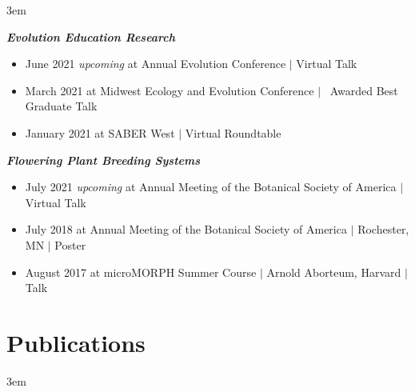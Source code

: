 \documentclass[]{article}
\begin{document}
\vspace{3mm}
\leftskip 3em

\textit{\textbf{Evolution Education Research}}
\begin{itemize}[label=$\mathwitch*$]
\item{June 2021 \textit{upcoming} at Annual Evolution Conference $\vert$ Virtual Talk 
\hspace{0.3mm} \href{https://ledelaney.org/talks/2021evolution}{\faImages} \href{https://github.com/ledelaney/06-21-Evolution}{\faGithub}}
\item{March 2021 at Midwest Ecology and Evolution Conference $\vert$ \faAward\ Awarded Best Graduate Talk \hspace{0.3mm} \href{https://ledelaney.org/talks/2021meec/}{\faImages} \href{https://github.com/ledelaney/03-21-MEEC}{\faGithub}}
\item{January 2021 at SABER West $\vert$ Virtual Roundtable \hspace{0.3mm} \href{https://ledelaney.org/talks/2021saberw/}{\faImages} \href{https://github.com/ledelaney/01-21-SABERwest}{\faGithub}}
\end{itemize}

\vspace{2mm}

\textit{\textbf{Flowering Plant Breeding Systems}}

\begin{itemize}[label=$\mathwitch*$]
\item{July 2021 \textit{upcoming} at Annual Meeting of the Botanical Society of America $\vert$ Virtual Talk}
\item{July 2018 at Annual Meeting of the Botanical Society of America $\vert$ Rochester, MN $\vert$ Poster \hspace{0.3mm} \href{https://ledelaney.org/static/posters/poster.png}{\faFileImage}}
\item{August 2017 at microMORPH Summer Course $\vert$ Arnold Aborteum, Harvard $\vert$ Talk \hspace{0.3mm} \href{https://www.dropbox.com/s/o7hcg5riw97wf9i/08-2017-microMORPH.pdf?dl=1}{\faImages}}
\end{itemize}
\vspace{1mm}

\section{Publications}

\vspace{3mm}
\leftskip 3em
\end{document}
